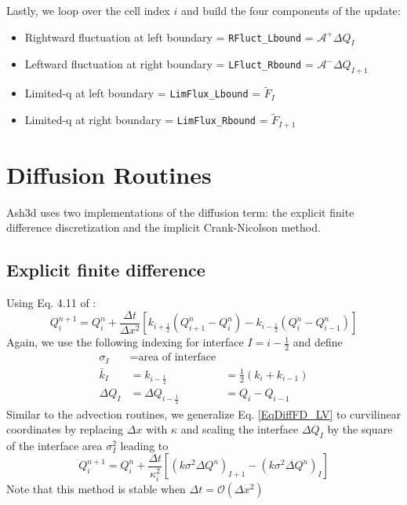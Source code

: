 Lastly, we loop over the cell index $i$ and build the four components of the update:
\begin{itemize}
 \item Rightward fluctuation at left boundary = \texttt{RFluct\_Lbound} = $\mathcal{A}^{+} \Delta Q_I$
 \item Leftward fluctuation at right boundary = \texttt{LFluct\_Rbound} = $\mathcal{A}^{-} \Delta Q_{I+1}$
 \item Limited-q at left boundary = \texttt{LimFlux\_Lbound} = $\widetilde{F}_I$
 \item Limited-q at right boundary = \texttt{LimFlux\_Rbound} = $\widetilde{F}_{I+1} $
\end{itemize}


\section{Diffusion Routines}
Ash3d uses two implementations of the diffusion term: the explicit finite difference
discretization and the implicit Crank-Nicolson method.  

\subsection{Explicit finite difference}
Using Eq. 4.11 of \cite{LeVeque2003}:
\begin{equation}\label{EqDiffFD_LV}
Q^{n+1}_i = Q^{n}_i + \frac{\Delta t}{\Delta x^2} \left[ k_{i+\frac{1}{2}}\left( Q^{n}_{i+1}-Q^{n}_{i}\right) -
k_{i-\frac{1}{2}}\left( Q^{n}_{i}-Q^{n}_{i-1}\right) \right]
\end{equation}
Again, we use the following indexing for interface $I=i-\frac{1}{2}$ and define
\begin{align*}
\sigma_I &= \text{area of interface} &  \\
\bar{k}_I &= k_{i-\frac{1}{2}} &= \frac{1}{2}\left( k_i + k_{i-1} \right)\\
\Delta Q_I &= \Delta Q_{i-\frac{1}{2}} &= Q_i - Q_{i-1} 
\end{align*}
Similar to the advection routines, we generalize Eq. \ref{EqDiffFD_LV} to curvilinear coordinates by replacing
$\Delta x$ with $\kappa$ and scaling the interface $\Delta Q_I$ by the square of the
interface area $\sigma_I^2$ leading to
\begin{equation}\label{EqDiffFD}
Q^{n+1}_i = Q^{n}_i + \frac{\Delta t}{\kappa_i^2} \left[ 
\left( k \sigma^2 \Delta Q^n \right)_{I+1} - 
\left( k \sigma^2 \Delta Q^n \right)_I  \right]
\end{equation}
Note that this method is stable when $\Delta t = \mathcal{O}(\Delta x^2)$

